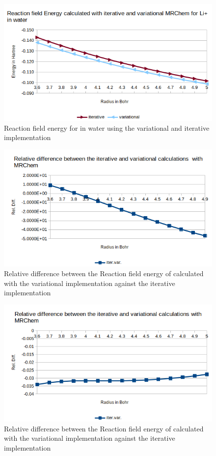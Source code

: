 \documentclass[../master_thesis.tex]{subfiles}
\begin{document}
\begin{figure}[!htb]
  \centering
  \includegraphics[width=0.75\linewidth]{img/lipvarEr.png}
  \caption{Reaction field energy for  in water using the variational and iterative implementation}
  \label{fig:lipvarEr}
\end{figure}

\begin{figure}[!htb]
  \centering
    \includegraphics[width=\linewidth]{img/watitervarreldiff.png}
  \caption{Relative difference between the Reaction field energy of  calculated with the variational implementation against the iterative implementation}
  \label{fig:watreldiffvardaug}
\end{figure}

\begin{figure}[!htb]
  \centering
    \includegraphics[width=\linewidth]{img/lipitervarreldiff.png}
  \caption{Relative difference between the Reaction field energy of  calculated with the variational implementation against the iterative implementation}
  \label{fig:lipreldiffvardaug}
\end{figure}
\clearpage
\end{document}

